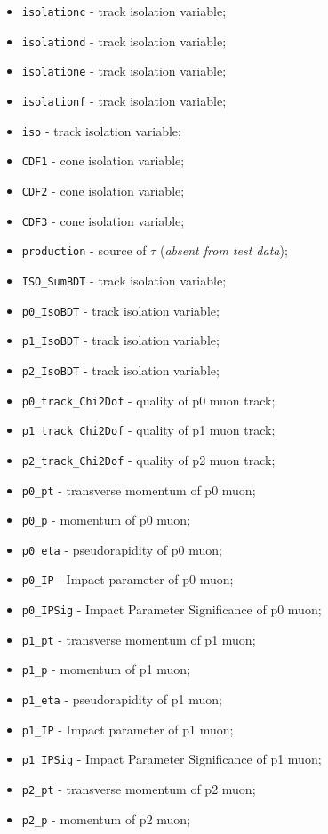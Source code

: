 \documentclass[11pt]{article}
\begin{document}
\begin{itemize}
	\item \texttt{isolationc} - track isolation variable;
	\item \texttt{isolationd} - track isolation variable;
	\item \texttt{isolatione} - track isolation variable;
	\item \texttt{isolationf} - track isolation variable;
	\item \texttt{iso} - track isolation variable;
	\item \texttt{CDF1} - cone isolation variable;
	\item \texttt{CDF2} - cone isolation variable;
	\item \texttt{CDF3} - cone isolation variable;
	\item \texttt{production} - source of $\tau$ (\textit{absent from test data});
	\item \texttt{ISO\_SumBDT} - track isolation variable;
	\item \texttt{p0\_IsoBDT} - track isolation variable;
	\item \texttt{p1\_IsoBDT} - track isolation variable;
	\item \texttt{p2\_IsoBDT} - track isolation variable;
	\item \texttt{p0\_track\_Chi2Dof} - quality of p0 muon track;
	\item \texttt{p1\_track\_Chi2Dof} - quality of p1 muon track;
	\item \texttt{p2\_track\_Chi2Dof} - quality of p2 muon track;
	\item \texttt{p0\_pt} - transverse momentum of p0 muon;
	\item \texttt{p0\_p} - momentum of p0 muon;
	\item \texttt{p0\_eta} - pseudorapidity of p0 muon;
	\item \texttt{p0\_IP} - Impact parameter of p0 muon;
	\item \texttt{p0\_IPSig} - Impact Parameter Significance of p0 muon;
	\item \texttt{p1\_pt} - transverse momentum of p1 muon;
	\item \texttt{p1\_p} - momentum of p1 muon;
	\item \texttt{p1\_eta} - pseudorapidity of p1 muon;
	\item \texttt{p1\_IP} - Impact parameter of p1 muon;
	\item \texttt{p1\_IPSig} - Impact Parameter Significance of p1 muon;
	\item \texttt{p2\_pt} - transverse momentum of p2 muon;
	\item \texttt{p2\_p} - momentum of p2 muon;

\end{itemize}
\end{document}
